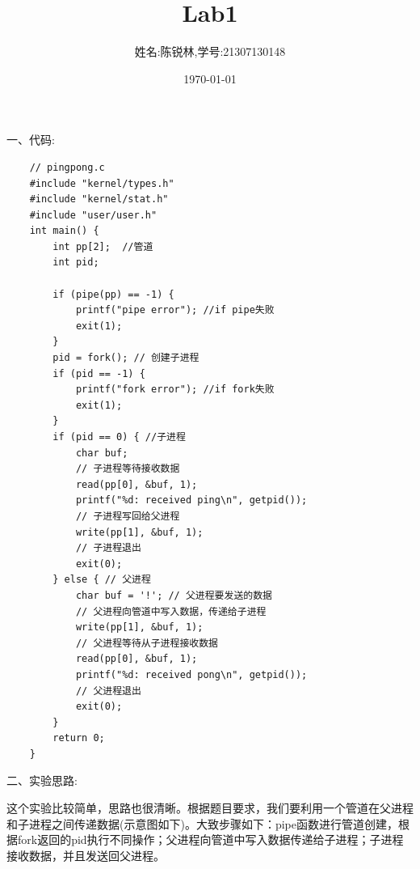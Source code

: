 \documentclass[12pt]{article}
\title{Lab1}
\author{姓名:陈锐林,学号:21307130148}
\date{\today}
\begin{document}
\maketitle
\begin{Large}
    \noindent 一、代码:
\end{Large}
\begin{lstlisting}
    // pingpong.c
    #include "kernel/types.h"
    #include "kernel/stat.h"
    #include "user/user.h"
    int main() {
        int pp[2];  //管道
        int pid;     
    
        if (pipe(pp) == -1) {
            printf("pipe error"); //if pipe失败
            exit(1);
        }
        pid = fork(); // 创建子进程
        if (pid == -1) {
            printf("fork error"); //if fork失败
            exit(1);
        }
        if (pid == 0) { //子进程
            char buf;
            // 子进程等待接收数据
            read(pp[0], &buf, 1);
            printf("%d: received ping\n", getpid());
            // 子进程写回给父进程
            write(pp[1], &buf, 1);
            // 子进程退出
            exit(0);
        } else { // 父进程
            char buf = '!'; // 父进程要发送的数据
            // 父进程向管道中写入数据，传递给子进程
            write(pp[1], &buf, 1);
            // 父进程等待从子进程接收数据
            read(pp[0], &buf, 1);
            printf("%d: received pong\n", getpid());
            // 父进程退出
            exit(0);
        }
        return 0;
    }
\end{lstlisting}
\vspace*{1cm}
\begin{Large}
    \noindent 二、实验思路:\\
\end{Large}
\hspace*{2em}这个实验比较简单，思路也很清晰。根据题目要求，我们要利用一个管道在父进程和子进程之间传递数据(示意图如下)。大致步骤如下：pipe函数进行管道创建，根据fork返回的pid执行不同操作；父进程向管道中写入数据传递给子进程；子进程接收数据，并且发送回父进程。\\
\end{document}
